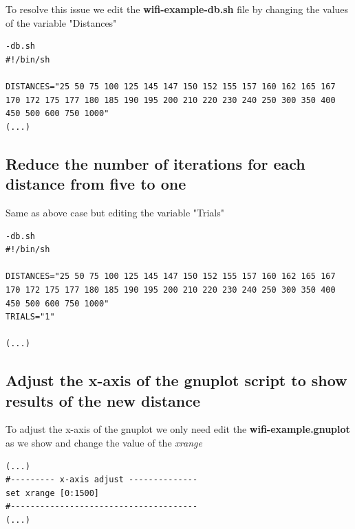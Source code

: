 \documentclass[a4paper,10pt]{article}
\begin{document}
\singlespacing
To resolve this issue we edit the \textbf{wifi-example-db.sh} file by changing the values of the variable "Distances"

\begin{lstlisting}[style=C]
-db.sh
#!/bin/sh

DISTANCES="25 50 75 100 125 145 147 150 152 155 157 160 162 165 167 170 172 175 177 180 185 190 195 200 210 220 230 240 250 300 350 400 450 500 600 750 1000"
(...)
\end{lstlisting}

\subsection{Reduce the number of iterations for each distance from five to one}

\singlespacing
Same as above case but editing the variable "Trials"

\begin{lstlisting}[style=C]
-db.sh
#!/bin/sh

DISTANCES="25 50 75 100 125 145 147 150 152 155 157 160 162 165 167 170 172 175 177 180 185 190 195 200 210 220 230 240 250 300 350 400 450 500 600 750 1000"
TRIALS="1"

(...)
\end{lstlisting}


\subsection{Adjust the x-axis of the gnuplot script to show results of the new distance}

\singlespacing
To adjust the x-axis of the gnuplot we only need edit the \textbf{wifi-example.gnuplot} as we show and change the value of the \emph{xrange}

\begin{lstlisting}[style=C]
(...)
#--------- x-axis adjust --------------
set xrange [0:1500]
#--------------------------------------
(...)
\end{lstlisting}
\end{document}
